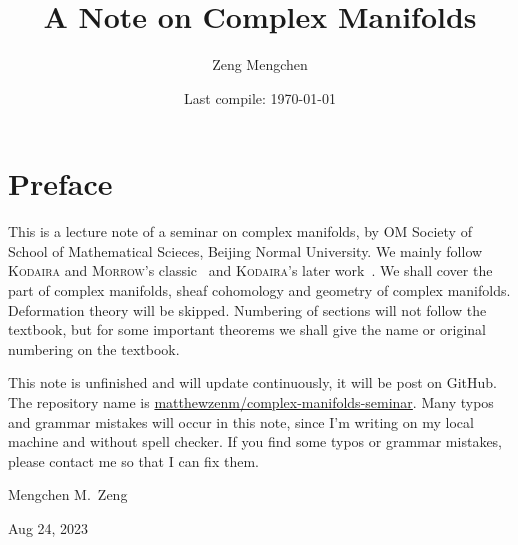\documentclass[a4paper]{book}
\title{A Note on Complex Manifolds}
\author{Zeng Mengchen}
\date{Last compile: \today}
\theoremstyle{definition}
\theoremstyle{plain}
\theoremstyle{remark}
\numberwithin{equation}{section}
\begin{document}
\maketitle
\thispagestyle{empty}

\frontmatter

\tableofcontents
\newpage
\thispagestyle{empty}

\chapter{Preface}

This is a lecture note of a seminar on complex manifolds, by OM Society of School of Mathematical Scieces, Beijing Normal University.
We mainly follow \textsc{Kodaira} and \textsc{Morrow}'s classic~\cite{Kodaira06} and \textsc{Kodaira}'s later work~\cite{Kodaira05}.
We shall cover the part of complex manifolds, sheaf cohomology and geometry of complex manifolds.
Deformation theory will be skipped.
Numbering of sections will not follow the textbook, but for some important theorems we shall give the name or original numbering on the textbook.

This note is unfinished and will update continuously, it will be post on GitHub.
The repository name is \href{https://github.com/matthewzenm/complex-manifolds-seminar}{matthewzenm/complex-manifolds-seminar}.
Many typos and grammar mistakes will occur in this note, since I'm writing on my local machine and without spell checker.
If you find some typos or grammar mistakes, please contact me so that I can fix them.

\begin{flushright}
    Mengchen M.\ Zeng

    Aug 24, 2023
\end{flushright}

\newpage
\thispagestyle{empty}

\mainmatter




\backmatter


\end{document}
